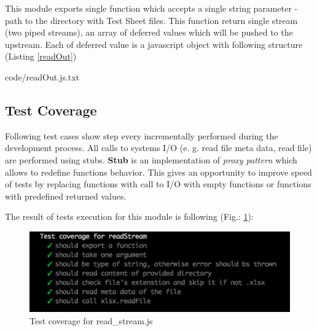 This module exports single function which accepts a single string parameter - path to the directory with Test Sheet files. This function return single stream (two piped streams),  an array of deferred values which will be pushed to the upstream. Each of deferred value  is a javascript object with following structure (Listing \ref{readOut})

{code/readOut.js.txt}

\subsection{Test Coverage}
Following test cases show step every incrementally performed during the development process. All calls to systems I/O (e. g. read file meta data, read file) are performed using stubs. \textbf{Stub} is an implementation of \textit{proxy pattern} which allows to redefine functions behavior. This gives an opportunity to improve speed of tests by replacing functions with call to I/O with empty functions or functions with predefined returned values.
%

The result of tests execution  for this module is following (Fig.: \ref{fig:testRead}):
\begin{figure}[H]
	\centering
	\includegraphics[width=\linewidth]{grafiken/testReadStream.png}
	\caption{Test coverage for read\_stream.js}
	\label{fig:testRead}
\end{figure}



